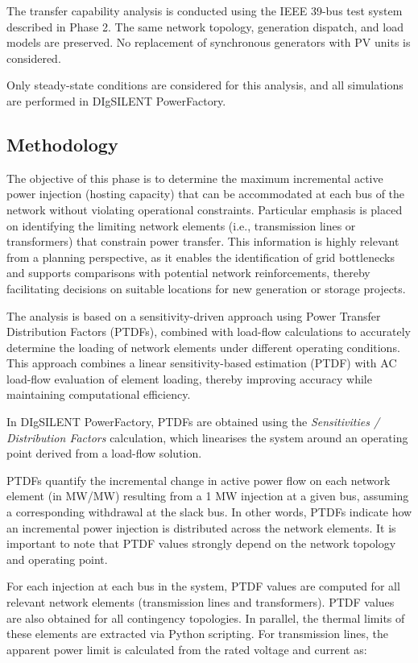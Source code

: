 The transfer capability analysis is conducted using the IEEE 39-bus test system described in Phase 2. The same network topology, generation dispatch, and load models are preserved. No replacement of synchronous generators with PV units is considered. 

Only steady-state conditions are considered for this analysis, and all simulations are performed in DIgSILENT PowerFactory.

\subsection{Methodology}

The objective of this phase is to determine the maximum incremental active power injection (hosting capacity) that can be accommodated at each bus of the network without violating operational constraints. Particular emphasis is placed on identifying the limiting network elements (i.e., transmission lines or transformers) that constrain power transfer. This information is highly relevant from a planning perspective, as it enables the identification of grid bottlenecks and supports comparisons with potential network reinforcements, thereby facilitating decisions on suitable locations for new generation or storage projects.

The analysis is based on a sensitivity-driven approach using Power Transfer Distribution Factors (PTDFs), combined with load-flow calculations to accurately determine the loading of network elements under different operating conditions. This approach combines a linear sensitivity-based estimation (PTDF) with AC load-flow evaluation of element loading, thereby improving accuracy while maintaining computational efficiency.

In DIgSILENT PowerFactory, PTDFs are obtained using the \textit{Sensitivities / Distribution Factors} calculation, which linearises the system around an operating point derived from a load-flow solution.

PTDFs quantify the incremental change in active power flow on each network element (in MW/MW) resulting from a 1 MW injection at a given bus, assuming a corresponding withdrawal at the slack bus. In other words, PTDFs indicate how an incremental power injection is distributed across the network elements. It is important to note that PTDF values strongly depend on the network topology and operating point.

For each injection at each bus in the system, PTDF values are computed for all relevant network elements (transmission lines and transformers). PTDF values are also obtained for all contingency topologies. In parallel, the thermal limits of these elements are extracted via Python scripting. For transmission lines, the apparent power limit is calculated from the rated voltage and current as:

